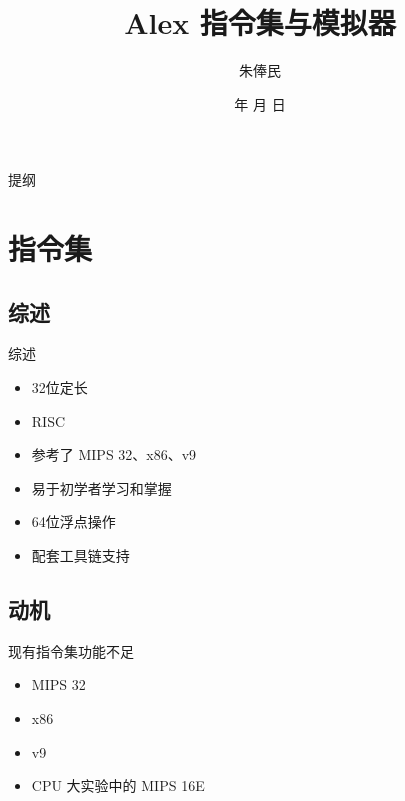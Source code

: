 \documentclass{beamer}
\renewcommand{\today}{\number\year 年 \number\month 月 \number\day 日}
\begin{document}
\title{Alex 指令集与模拟器}
\author{朱俸民}
\date{\today}



\begin{frame}
    \titlepage
\end{frame}

\begin{frame}{提纲}
    \tableofcontents
\end{frame}

\section{指令集}

\subsection{综述}

\begin{frame}{综述}
    \begin{itemize}
        \item 32位定长
        \item RISC
        \item 参考了 MIPS 32、x86、v9
        \item 易于初学者学习和掌握
        \item 64位浮点操作
        \item 配套工具链支持
    \end{itemize}
\end{frame}

\subsection{动机}

\begin{frame}{现有指令集功能不足}
    \begin{itemize}
        \item MIPS 32
        \item x86
        \item v9
        \item CPU 大实验中的 MIPS 16E
    \end{itemize}
\end{frame}
\end{document}
